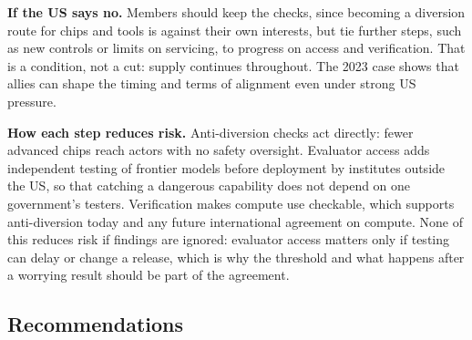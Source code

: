 \documentclass[11pt]{article}
\begin{document}
\textbf{If the US says no.} Members should keep the checks, since becoming a diversion route for chips and tools is against their own interests, but tie further steps, such as new controls or limits on servicing, to progress on access and verification. That is a condition, not a cut: supply continues throughout. The 2023 case shows that allies can shape the timing and terms of alignment even under strong US pressure.

\textbf{How each step reduces risk.} Anti-diversion checks act directly: fewer advanced chips reach actors with no safety oversight. Evaluator access adds independent testing of frontier models before deployment by institutes outside the US, so that catching a dangerous capability does not depend on one government's testers. Verification makes compute use checkable, which supports anti-diversion today and any future international agreement on compute. None of this reduces risk if findings are ignored: evaluator access matters only if testing can delay or change a release, which is why the threshold and what happens after a worrying result should be part of the agreement.

\subsection{Recommendations}
\end{document}

